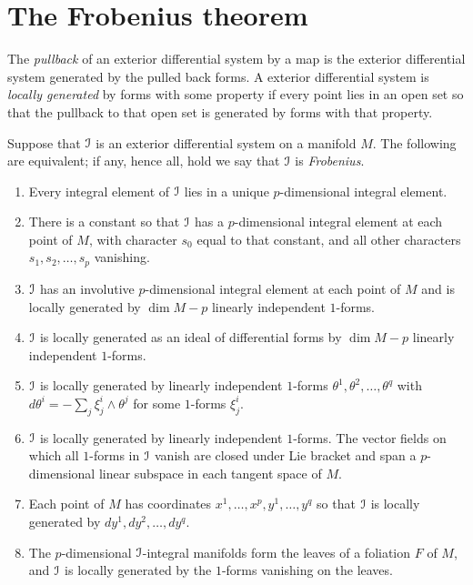 \section{The Frobenius theorem}
The \emph{pullback} of an exterior differential system by a map is the exterior differential system generated by the pulled back forms.
A exterior differential system is \emph{locally generated} by forms with some property if every point lies in an open set so that the pullback to that open set is generated by forms with that property.
\begin{theorem}[Frobenius]
Suppose that \(\mathcal{I}\) is an exterior differential system on a manifold \(M\).
The following are equivalent; if any, hence all, hold we say that \(\mathcal{I}\) is \emph{Frobenius}.
\begin{enumerate}
\item 
Every integral element of \(\mathcal{I}\) lies in a unique \(p\)-dimensional integral element.
\item
There is a constant so that \(\mathcal{I}\) has a \(p\)-dimensional integral element at each point of \(M\), with character \(s_0\) equal to that constant, and all other characters \(s_1,s_2,\dots,s_p\) vanishing.
\item
\(\mathcal{I}\) has an involutive \(p\)-dimensional integral element at each point of \(M\) and is locally generated by \(\dim M - p\) linearly independent \(1\)-forms.
\item
\(\mathcal{I}\) is locally generated as an ideal of differential forms by \(\dim M - p\) linearly independent \(1\)-forms.
\item
\(\mathcal{I}\) is locally generated by linearly independent \(1\)-forms \(\theta^1,\theta^2,\dots,\theta^q\) with \(d\theta^i=-\sum_j \xi^i_j \wedge \theta^j\) for some \(1\)-forms \(\xi^i_j\).
\item 
\(\mathcal{I}\) is locally generated by linearly independent \(1\)-forms.
The vector fields on which all \(1\)-forms in \(\mathcal{I}\) vanish are closed under Lie bracket and span a \(p\)-dimensional linear subspace in each tangent space of \(M\). 
\item
Each point of \(M\) has coordinates \(x^1,\dots,x^p,y^1,\dots,y^q\) so that \(\mathcal{I}\) is locally generated by \(dy^1,dy^2,\dots,dy^q\).
\item
The \(p\)-dimensional \(\mathcal{I}\)-integral manifolds form the leaves of a foliation \(F\) of \(M\), and \(\mathcal{I}\) is locally generated by the \(1\)-forms vanishing on the leaves.
\end{enumerate}
\end{theorem}
